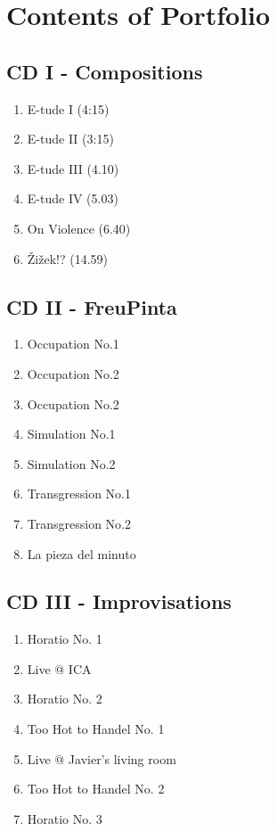 \chapter*{Contents of Portfolio}

\section*{CD I - Compositions}

\begin{enumerate}
\item E-tude I (4:15)
\item E-tude II (3:15)
\item E-tude III (4.10)
\item E-tude IV (5.03)
\item On Violence (6.40)
\item \v{Z}i\v{z}ek!? (14.59)
\end{enumerate}

\section*{CD II - FreuPinta}

\begin{enumerate}
\item Occupation No.1
\item Occupation No.2
\item Occupation No.2
\item Simulation No.1
\item Simulation No.2
\item Transgression No.1
\item Transgression No.2
\item La pieza del minuto
\end{enumerate}

\section*{CD III - Improvisations}

\begin{enumerate}
\item Horatio No. 1 
\item Live @ ICA
\item Horatio No. 2
\item Too Hot to Handel No. 1
\item Live @ Javier's living room
\item Too Hot to Handel No. 2
\item Horatio No. 3
\end{enumerate}


